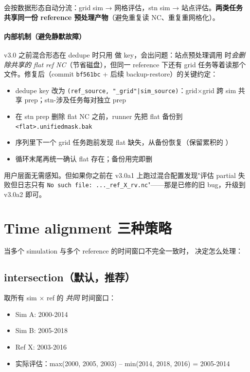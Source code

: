\openbench{} 会按数据形态自动分流：grid sim → 网格评估，stn sim → 站点评估。\textbf{两类任务共享同一份 reference 预处理产物}（避免重复读 NC、重复重网格化）。

\paragraph{内部机制（避免静默故障）}

v3.0 之前混合形态在 dedupe 时只用  做 key，会出问题：站点预处理调用  时\emph{会删除共享的 flat ref NC}（节省磁盘），但同一 reference 下还有 grid 任务等着读那个文件。修复后（commit \texttt{bf561bc} + 后续 backup-restore）的关键约定：

\begin{itemize}
  \item dedupe key 改为 \texttt{(ref\_source, "\_grid"|sim\_source)}：grid×grid 跨 sim 共享 prep；stn-涉及任务每对独立 prep
  \item 在 stn prep 删除 flat NC 之前，runner 先把 flat 备份到 \texttt{<flat>.unifiedmask.bak}
  \item 序列里下一个 grid 任务跑前发现 flat 缺失，从备份恢复（保留累积的 ）
  \item 循环末尾再统一确认 flat 存在；备份用完即删
\end{itemize}

用户层面无需感知。但如果你之前在 v3.0a1 上跑过混合配置发现"评估 partial 失败但日志只有 \texttt{No such file: ...\_ref\_X\_rv.nc}"——那是已修的旧 bug，升级到 v3.0a2 即可。

\section{Time alignment 三种策略}

当多个 simulation 与多个 reference 的时间窗口不完全一致时， 决定怎么处理：

\subsection{intersection（默认，推荐）}

取所有 sim × ref 的 \emph{共同} 时间窗口：

\begin{itemize}
  \item Sim A: 2000-2014
  \item Sim B: 2005-2018
  \item Ref X: 2003-2016
  \item 实际评估：max(2000, 2005, 2003) -- min(2014, 2018, 2016) = 2005-2014
\end{itemize}

